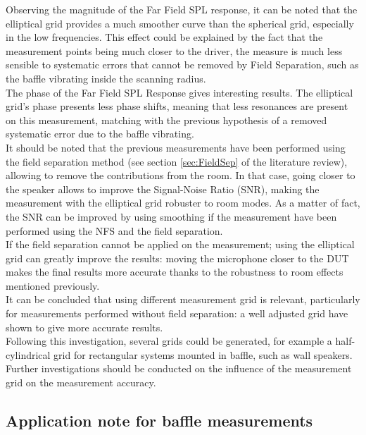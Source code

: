 \documentclass{report}
\begin{document}
Observing the magnitude of the Far Field SPL response, it can be noted that the elliptical grid provides a much smoother curve than the spherical grid, especially in the low frequencies. This effect could be explained by the fact that the measurement points being much closer to the driver, the measure is much less sensible to systematic errors that cannot be removed by Field Separation, such as the baffle vibrating inside the scanning radius. \\
The phase of the Far Field SPL Response gives interesting results. The elliptical grid's phase presents less phase shifts, meaning that less resonances are present on this measurement, matching with the previous hypothesis of a removed systematic error due to the baffle vibrating. \\

It should be noted that the previous measurements have been performed using the field separation method (see section \ref{sec:FieldSep} of the literature review), allowing to remove the contributions from the room. In that case, going closer to the speaker allows to improve the Signal-Noise Ratio (SNR), making the measurement with the elliptical grid robuster to room modes.
As a matter of fact, the SNR can be improved by using smoothing if the measurement have been performed using the NFS and the field separation.\\

If the field separation cannot be applied on the measurement; using the elliptical grid can greatly improve the results: moving the microphone closer to the DUT makes the final results more accurate thanks to the robustness to room effects mentioned previously. \\


It can be concluded that using different measurement grid is relevant, particularly for measurements performed without field separation: a well adjusted grid have shown to give more accurate results. \\
Following this investigation, several grids could be generated, for example a half-cylindrical grid for rectangular systems mounted in baffle, such as wall speakers. Further investigations should be conducted on the influence of the measurement grid on the measurement accuracy.

\subsection{Application note for baffle measurements}
\end{document}
